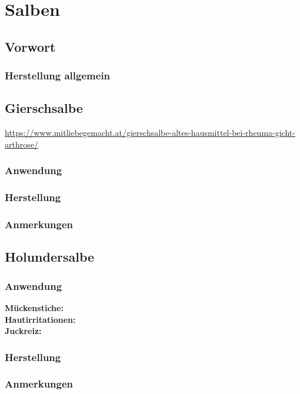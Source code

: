 \chapter{Salben}

\section{Vorwort}

\lipsum[1-5]
\newpage



\subsection{Herstellung allgemein}



\section{Gierschsalbe}

\url{https://www.mitliebegemacht.at/gierschsalbe-altes-hausmittel-bei-rheuma-gicht-arthrose/}

\subsection{Anwendung}

\subsection{Herstellung}

\subsection{Anmerkungen}





\section{Holundersalbe}

\subsection{Anwendung}

\textbf{Mückenstiche:} \\ 

\textbf{Hautirritationen:} \\ 

\textbf{Juckreiz:} \\ 

\subsection{Herstellung}

\subsection{Anmerkungen}